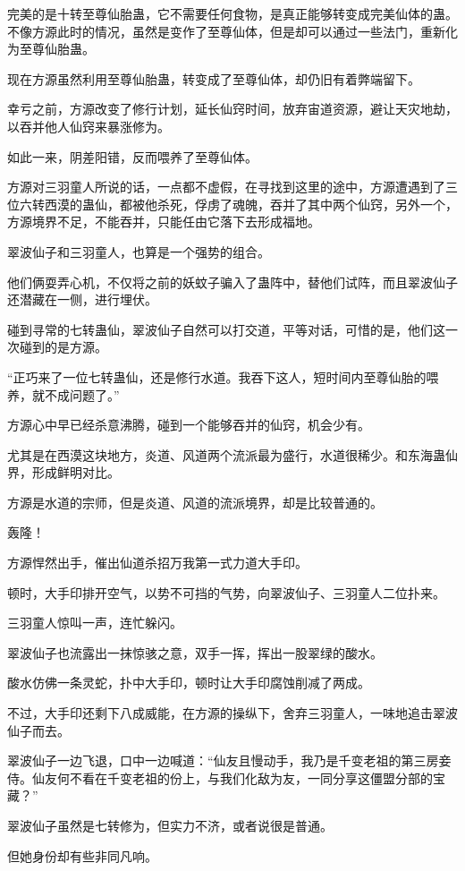 \begin{this_body}
完美的是十转至尊仙胎蛊，它不需要任何食物，是真正能够转变成完美仙体的蛊。不像方源此时的情况，虽然是变作了至尊仙体，但是却可以通过一些法门，重新化为至尊仙胎蛊。

现在方源虽然利用至尊仙胎蛊，转变成了至尊仙体，却仍旧有着弊端留下。

幸亏之前，方源改变了修行计划，延长仙窍时间，放弃宙道资源，避让天灾地劫，以吞并他人仙窍来暴涨修为。

如此一来，阴差阳错，反而喂养了至尊仙体。

方源对三羽童人所说的话，一点都不虚假，在寻找到这里的途中，方源遭遇到了三位六转西漠的蛊仙，都被他杀死，俘虏了魂魄，吞并了其中两个仙窍，另外一个，方源境界不足，不能吞并，只能任由它落下去形成福地。

翠波仙子和三羽童人，也算是一个强势的组合。

他们俩耍弄心机，不仅将之前的妖蚊子骗入了蛊阵中，替他们试阵，而且翠波仙子还潜藏在一侧，进行埋伏。

碰到寻常的七转蛊仙，翠波仙子自然可以打交道，平等对话，可惜的是，他们这一次碰到的是方源。

“正巧来了一位七转蛊仙，还是修行水道。我吞下这人，短时间内至尊仙胎的喂养，就不成问题了。”

方源心中早已经杀意沸腾，碰到一个能够吞并的仙窍，机会少有。

尤其是在西漠这块地方，炎道、风道两个流派最为盛行，水道很稀少。和东海蛊仙界，形成鲜明对比。

方源是水道的宗师，但是炎道、风道的流派境界，却是比较普通的。

轰隆！

方源悍然出手，催出仙道杀招万我第一式力道大手印。

顿时，大手印排开空气，以势不可挡的气势，向翠波仙子、三羽童人二位扑来。

三羽童人惊叫一声，连忙躲闪。

翠波仙子也流露出一抹惊骇之意，双手一挥，挥出一股翠绿的酸水。

酸水仿佛一条灵蛇，扑中大手印，顿时让大手印腐蚀削减了两成。

不过，大手印还剩下八成威能，在方源的操纵下，舍弃三羽童人，一味地追击翠波仙子而去。

翠波仙子一边飞退，口中一边喊道：“仙友且慢动手，我乃是千变老祖的第三房妾侍。仙友何不看在千变老祖的份上，与我们化敌为友，一同分享这僵盟分部的宝藏？”

翠波仙子虽然是七转修为，但实力不济，或者说很是普通。

但她身份却有些非同凡响。


\end{this_body}

